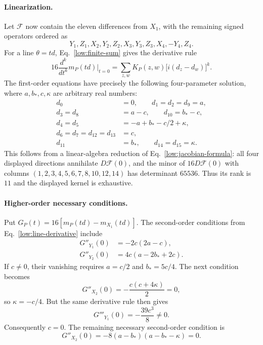 \paragraph{Linearization.}
Let $\mathcal F$ now contain the eleven differences from $X_1$, with the
remaining signed operators ordered as
\begin{equation*}
 Y_1,Z_1,X_2,Y_2,Z_2,X_3,Y_3,Z_3,X_4,-Y_4,Z_4.
\end{equation*}
For a line $\theta=td$, Eq.~\eqref{low:finite-sum} gives the
derivative rule
\begin{equation}
 16\frac{d^k}{dt^k}m_P(td)\bigg|_{t=0}
 =\sum_{z,w}K_P(z,w)\bigl[i(d_z-d_w)\bigr]^k.
 \label{low:line-derivative}
\end{equation}
The first-order equations have precisely the following four-parameter
solution, where $a,b_*,c,\kappa$ are arbitrary real numbers:
\begin{equation}
 \begin{aligned}
 d_0&=0,\qquad d_1=d_2=d_9=a,\\
 d_3=d_8&=a-c,\qquad d_{10}=b_*-c,\\
 d_4=d_5&=-a+b_*-c/2+\kappa,\\
 d_6=d_7=d_{12}=d_{13}&=c,\\
 d_{11}&=b_*,\qquad d_{14}=d_{15}=\kappa.
 \end{aligned}
 \label{low:kernel-four}
\end{equation}
This follows from a linear-algebra reduction of
Eq.~\eqref{low:jacobian-formula}: all four displayed directions annihilate
$D\mathcal F(0)$, and the minor of $16D\mathcal F(0)$ with columns
$(1,2,3,4,5,6,7,8,10,12,14)$ has determinant $65536$.
Thus its rank is $11$ and the displayed kernel is exhaustive.

\paragraph{Higher-order necessary conditions.}
Put $G_P(t)=16[m_P(td)-m_{X_1}(td)]$.  The second-order conditions from
Eq.~\eqref{low:line-derivative} include
\begin{align}
 G''_{Y_1}(0)&=-2c(2a-c),\nonumber\\
 G''_{Y_2}(0)&=4c(a-2b_*+2c).
 \label{low:second-order}
\end{align}
If $c\ne0$, their vanishing requires $a=c/2$ and $b_*=5c/4$.
The next condition becomes
\begin{equation}
 G''_{X_2}(0)=-\frac{c(c+4\kappa)}2=0,
\end{equation}
so $\kappa=-c/4$.  But the same derivative rule then gives
\begin{equation}
 G'''_{Y_1}(0)=-\frac{39c^3}{8}\ne0.
 \label{low:third-order}
\end{equation}
Consequently $c=0$.  The remaining necessary second-order condition is
\begin{equation}
 G''_{X_2}(0)=-8(a-b_*)(a-b_*-\kappa)=0.
 \label{low:two-planes}
\end{equation}

